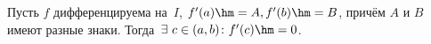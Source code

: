 
        Пусть $f$ дифференцируема на~$I$, $f'(a)\hm=A, f'(b)\hm=B$, причём $A$ и $B$ имеют разные знаки. Тогда~$\exists\  c\in(a,b)\colon f'(c)\hm=0$.
    